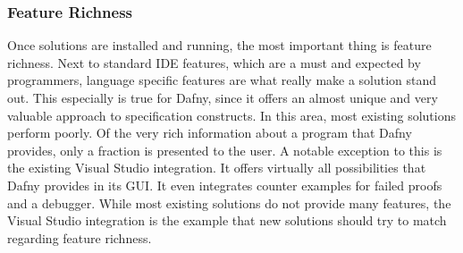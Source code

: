\subsubsection{Feature Richness}
Once solutions are installed and running, the most important thing is feature richness. Next to standard IDE features, which are a must and expected by programmers, language specific features are what really make a solution stand out. This especially is true for Dafny, since it offers an almost unique and very valuable approach to specification constructs. In this area, most existing solutions perform poorly. Of the very rich information about a program that Dafny provides, only a fraction is presented to the user. \newline
A notable exception to this is the existing Visual Studio integration. It offers virtually all possibilities that Dafny provides in its GUI. It even integrates counter examples for failed proofs and a debugger. While most existing solutions do not provide many features, the Visual Studio integration is the example that new solutions should try to match regarding feature richness.

